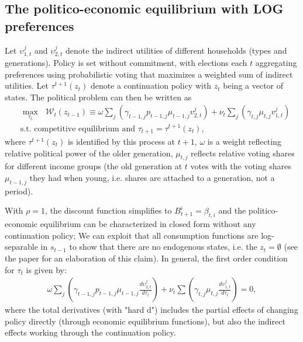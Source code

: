 \documentclass[a4paper]{article}
\begin{document}
\subsection{The politico-economic equilibrium with LOG preferences}\label{\refsec:PEELOG}
Let $\upsilon_{1,t}^j$ and $\upsilon_{2,t}^j$ denote the indirect utilities of different households (types and generations). Policy is set without commitment, with elections each $t$ aggregating preferences using probabilistic voting that maximizes a weighted sum of indirect utilities. Let $\tau^{t+1}(z_t)$ denote a continuation policy with $z_t$ being a vector of states. The political problem can then be written as
\begin{align*}
    &\max_{\tau_t}\mbox{ }\mathcal{W}_t(z_{t-1}) \equiv \omega\sum_j\left(\gamma_{t-1,j} p_{t-1,j} \mu_{t-1,j} v_{2,t}^j\right)+\nu_t\sum_j\left(\gamma_{t,j}\mu_{t,j} v_{1,t}^j\right) \\
    &\text{s.t. competitive equilibrium and }\tau_{t+1} = \tau^{t+1}(z_t),
\end{align*}
where $\tau^{t+1}(z_t)$ is identified by this process at $t+1$, $\omega$ is a weight reflecting relative political power of the older generation, $\mu_{t,j}$ reflects relative voting shares for different income groups (the old generation at $t$ votes with the voting shares $\mu_{t-1,j}$ they had when young, i.e. shares are attached to a generation, not a period).

With $\rho = 1$, the discount function simplifies to $B_{t+1}^i = \beta_{t,i}$ and the politico-economic equilibrium can be characterized in closed form without any continuation policy; We can exploit that all consumption functions are log-separable in $s_{t-1}$ to show that there are no endogenous states, i.e. the $z_t = \emptyset$ (see the paper for an elaboration of this claim). In general, the first order condition for $\tau_t$ is given by:
\begin{align*}
    \omega\sum_{j}\left(\gamma_{t-1,j}p_{t-1,j}\mu_{t-1,j} \frac{d\upsilon_{2,t}^j}{d\tau_t}\right)+
    \nu_t\sum\left(\gamma_{t,j}\mu_{t,j} \frac{d\upsilon_{1,t}^j}{d\tau_t}\right) = 0,
\end{align*}
where the total derivatives (with "hard d") includes the partial effects of changing policy directly (through economic equilibrium functions), but also the indirect effects working through the continuation policy. 
\end{document}
